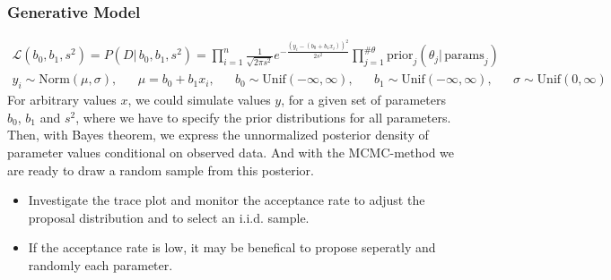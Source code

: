\subsubsection{Generative Model}
\begin{align*}
\mathcal{L}(b_0, b_1, s^2)
=
P(D |\, b_0, b_1, s^2)
=
\prod_{i=1}^n \frac{1}{\sqrt{2\pi s^2}}
e^{-\frac{\left(y_i - (b_0 + b_1 x_i)\right)^2}{2s^2}}
\prod_{j=1}^{\#\theta} \text{prior}_j(\theta_j|\,\text{params}_j)
\end{align*}
\begin{align*}
y_i
\sim
\text{Norm}(\mu, \sigma)
, &  &
\mu
=
b_0 + b_1 x_i
, &  &
b_0
\sim
\text{Unif}(-\infty, \infty)
, &  &
b_1
\sim
\text{Unif}(-\infty, \infty)
, &  &
\sigma
\sim
\text{Unif}(0, \infty)
\end{align*}
For arbitrary values $x$,
we could simulate values $y$,
for a given set of parameters $b_0$, $b_1$ and $s^2$,
where we have to specify the prior distributions for all parameters.
Then, with Bayes theorem, we express the unnormalized posterior density of
parameter values conditional on observed data.
And with the MCMC-method we are ready to draw a random sample from this
posterior.
\begin{itemize}
\item Investigate the trace plot and monitor the acceptance rate to adjust the
proposal distribution and to select an i.i.d. sample.
\item If the acceptance rate is low, it may be benefical to propose seperatly
and randomly each parameter.
\end{itemize}
$ $
